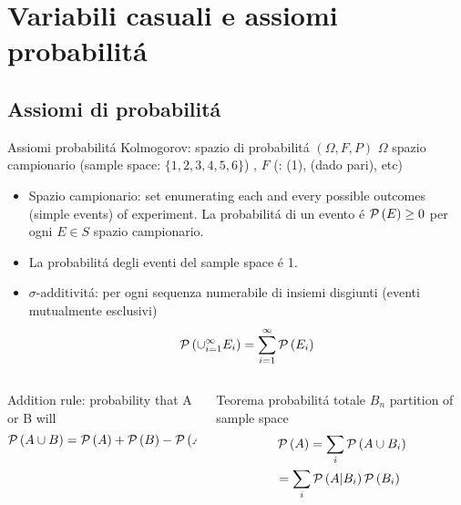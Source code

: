 \documentclass[asd-beamer.tex]{subfiles}
\begin{document}
\section{Variabili casuali e assiomi probabilit\'a}

\subsection{Assiomi di probabilit\'a}

\begin{frame}{Assiomi probabilit\'a Kolmogorov: spazio di probabilit\'a $(\Omega,F,P)$}
$\Omega$ spazio campionario (sample space: $\{1,2,3,4,5,6\}$) , $F$ (: (1), (dado pari), etc) 
\begin{itemize}
\item Spazio campionario: set enumerating each and every possible outcomes (simple events) of experiment. La probabilit\'a di un evento \'e $\operatorname{\mathcal{P}}{(E)}\geq0$ per ogni $E\in S$ spazio campionario.
\item La probabilit\'a degli eventi del sample space \'e 1.
\item $\sigma$-additivit\'a: per ogni sequenza numerabile di insiemi disgiunti (eventi mutualmente esclusivi)
\begin{equation*}
\operatorname{\mathcal{P}}{(\cup_{i=1}^{\infty}E_i)}=\sum_{i=1}^{\infty}\operatorname{\mathcal{P}}{(E_i)}
\end{equation*}
\end{itemize}
\begin{columns}[T]
	\begin{column}{0.5\textwidth}
\begin{block}{Addition rule: probability that A or B will}
\begin{equation*}
\operatorname{\mathcal{P}}{(A\cup B)}=\operatorname{\mathcal{P}}{(A)}+\operatorname{\mathcal{P}}{(B)}-\operatorname{\mathcal{P}}{(A\cap B)}
\end{equation*}
\end{block}
\end{column}
\begin{column}{0.5\textwidth}
\begin{block}{Teorema probabilit\'a totale}
$B_n$ partition of sample space
\begin{align*}
&\operatorname{\mathcal{P}}{(A)}=\sum_i\operatorname{\mathcal{P}}{(A\cup B_i)}\\
&=\sum_i\operatorname{\mathcal{P}}{(A|B_i)}\operatorname{\mathcal{P}}{(B_i)}
\end{align*}
\end{block}
\end{column}
\end{columns}
\end{frame}
\end{document}
